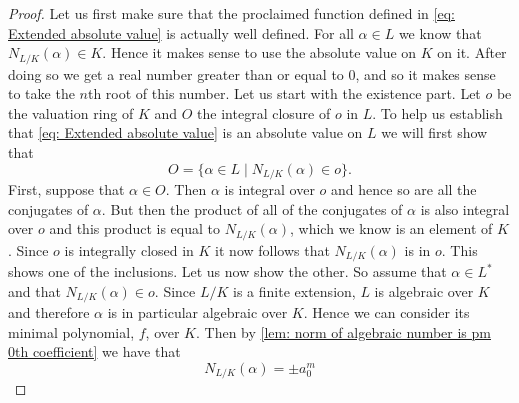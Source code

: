 \documentclass{article}
\begin{document}
\begin{proof}
    Let us first make sure that the proclaimed function defined in \cref{eq: Extended absolute value} is actually well defined. For all $\alpha \in L$ we know that $N_{L/K}(\alpha) \in K$. Hence it makes sense to use the absolute value on $K$ on it. After doing so we get a real number greater than or equal to 0, and so it makes sense to take the $n$th root of this number. Let us start with the existence part. Let $o$ be the valuation ring of $K$ and $O$ the integral closure of $o$ in $L$. To help us establish that \cref{eq: Extended absolute value} is an absolute value on $L$ we will first show that
    \begin{equation}\label{eq: Extension of absolute value helper result}
        O = \{\alpha \in L \mid N_{L/K}(\alpha) \in o \}.\tag{$\triangle$}
    \end{equation}
    First, suppose that $\alpha \in O$. Then $\alpha$ is integral over $o$ and hence so are all the conjugates of $\alpha$. But then the product of all of the conjugates of $\alpha$ is also integral over $o$ and this product is equal to $N_{L/K}(\alpha)$, which we know is an element of $K$. Since $o$ is integrally closed in $K$ it now follows that $N_{L/K}(\alpha)$ is in $o$. This shows one of the inclusions. Let us now show the other. So assume that $\alpha \in L^*$ and that $N_{L/K}(\alpha) \in o$. Since $L / K$ is a finite extension, $L$ is algebraic over $K$ and therefore $\alpha$ is in particular algebraic over $K$. Hence we can consider its minimal polynomial, $f$, over $K$. Then by \cref{lem: norm of algebraic number is pm 0th coefficient} we have that
    $$N_{L / K}(\alpha) =  \pm a_0^m$$

\end{proof}
\end{document}
